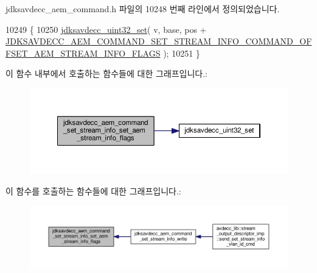 jdksavdecc\+\_\+aem\+\_\+command.\+h 파일의 10248 번째 라인에서 정의되었습니다.


\begin{DoxyCode}
10249 \{
10250     \hyperlink{group__endian_ga59b24ae6f7f47ca4d24ea337543162bf}{jdksavdecc\_uint32\_set}( v, base, pos + 
      \hyperlink{group__command__set__stream__info_gaef8a0573e8b5fe63b636e92f219d763d}{JDKSAVDECC\_AEM\_COMMAND\_SET\_STREAM\_INFO\_COMMAND\_OFFSET\_AEM\_STREAM\_INFO\_FLAGS}
       );
10251 \}
\end{DoxyCode}


이 함수 내부에서 호출하는 함수들에 대한 그래프입니다.\+:
\nopagebreak
\begin{figure}[H]
\begin{center}
\leavevmode
\includegraphics[width=350pt]{group__command__set__stream__info_ga0fc97d4aa9529b7aaf07d6f5d4a4792a_cgraph}
\end{center}
\end{figure}




이 함수를 호출하는 함수들에 대한 그래프입니다.\+:
\nopagebreak
\begin{figure}[H]
\begin{center}
\leavevmode
\includegraphics[width=350pt]{group__command__set__stream__info_ga0fc97d4aa9529b7aaf07d6f5d4a4792a_icgraph}
\end{center}
\end{figure}


